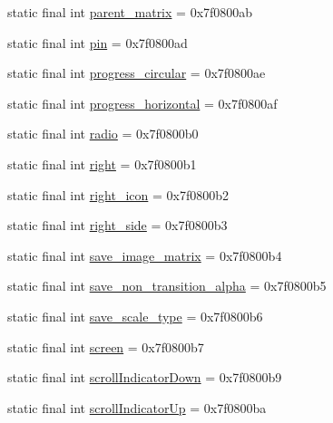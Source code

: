 \begin{DoxyCompactItemize}
\item 
static final int \mbox{\hyperlink{classandroid_1_1support_1_1design_1_1R_1_1id_a2bd745f280249f388515643ee6c1a821}{parent\+\_\+matrix}} = 0x7f0800ab
\item 
static final int \mbox{\hyperlink{classandroid_1_1support_1_1design_1_1R_1_1id_a64b02d83c7966402e2d4731279fc4459}{pin}} = 0x7f0800ad
\item 
static final int \mbox{\hyperlink{classandroid_1_1support_1_1design_1_1R_1_1id_a24bfc1b1443d3b08a28b08402fcfae13}{progress\+\_\+circular}} = 0x7f0800ae
\item 
static final int \mbox{\hyperlink{classandroid_1_1support_1_1design_1_1R_1_1id_a0ab595e62dd9b749124e5adb812fa736}{progress\+\_\+horizontal}} = 0x7f0800af
\item 
static final int \mbox{\hyperlink{classandroid_1_1support_1_1design_1_1R_1_1id_a97840ad47561a6d255ff054ba4e9920d}{radio}} = 0x7f0800b0
\item 
static final int \mbox{\hyperlink{classandroid_1_1support_1_1design_1_1R_1_1id_a6d2ecb72c1c1c7e0da0f1b2b7d153e30}{right}} = 0x7f0800b1
\item 
static final int \mbox{\hyperlink{classandroid_1_1support_1_1design_1_1R_1_1id_a54c6b12bf337a93aab8931cea42f9775}{right\+\_\+icon}} = 0x7f0800b2
\item 
static final int \mbox{\hyperlink{classandroid_1_1support_1_1design_1_1R_1_1id_a93836db3949e044a6dfbad64ae62cab7}{right\+\_\+side}} = 0x7f0800b3
\item 
static final int \mbox{\hyperlink{classandroid_1_1support_1_1design_1_1R_1_1id_a58cd069e576aa4d3eda461492763756f}{save\+\_\+image\+\_\+matrix}} = 0x7f0800b4
\item 
static final int \mbox{\hyperlink{classandroid_1_1support_1_1design_1_1R_1_1id_a9480978f499efdfd69d36cd24da62e87}{save\+\_\+non\+\_\+transition\+\_\+alpha}} = 0x7f0800b5
\item 
static final int \mbox{\hyperlink{classandroid_1_1support_1_1design_1_1R_1_1id_a343189d588551626c780b1569d7c03c3}{save\+\_\+scale\+\_\+type}} = 0x7f0800b6
\item 
static final int \mbox{\hyperlink{classandroid_1_1support_1_1design_1_1R_1_1id_a613b55667004b367557c603b0c685f13}{screen}} = 0x7f0800b7
\item 
static final int \mbox{\hyperlink{classandroid_1_1support_1_1design_1_1R_1_1id_a17784d8de2698de349a8c79f628577a1}{scroll\+Indicator\+Down}} = 0x7f0800b9
\item 
static final int \mbox{\hyperlink{classandroid_1_1support_1_1design_1_1R_1_1id_a9e01295deb3b05381329d91aad8489a4}{scroll\+Indicator\+Up}} = 0x7f0800ba

\end{DoxyCompactItemize}
